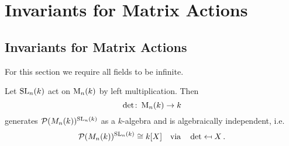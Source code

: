 \chapter{Invariants for Matrix Actions}





\section{Invariants for Matrix Actions}
For this section we require all fields to be infinite.


\begin{theorem}
  Let $\operatorname{SL}_n(k)$ act on $\operatorname{M}_n(k)$ by left multiplication. Then
  \[
            \det
    \colon  \operatorname{M}_n(k)
    \to     k
  \]
  generates $\mathcal{P}(M_n(k))^{\operatorname{SL}_n(k)}$ as a $k$-algebra and is algebraically independent, i.e.\
  \[
              \mathcal{P}(M_n(k))^{\operatorname{SL}_n(k)}
    \cong     k[X]
    \quad\text{via}\quad
              \det
    \mapsfrom X \,.
  \]
\end{theorem}
